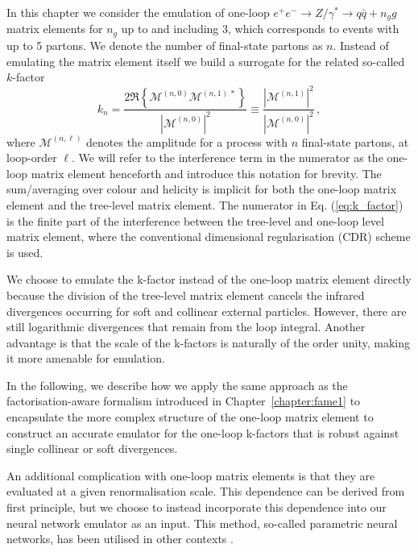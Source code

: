 \documentclass[main.tex]{subfiles}
\begin{document}
In this chapter we consider the emulation of one-loop 
$e^+e^-\rightarrow Z / \gamma^{*} \rightarrow q\bar q +n_{g} g$
matrix elements for $n_{g}$ up to and including 3, which corresponds
to events with up to 5 partons. We denote the number of final-state
partons as $n$. Instead of emulating the matrix element itself we build
a surrogate for the related so-called $k$-factor
\begin{equation}
    k_{n} = \dfrac{2 \Re \left\{ \mathcal{M}^{(n, 0)} \mathcal{M}^{(n, 1)\, *} \right\} }{ |\mathcal{M}^{(n, 0)}|^{2} } \equiv \dfrac{|\mathcal{M}^{(n, 1)}|^{2}}{|\mathcal{M}^{(n, 0)}|^{2}} \, ,
    \label{eq:k_factor}
\end{equation}
where $\mathcal{M}^{(n, \ell)}$ denotes the amplitude
for a process with $n$ final-state partons, at loop-order
$\ell$. We will refer to the interference term in the numerator
as the one-loop matrix element henceforth and introduce
this notation for brevity.
The sum/averaging over colour and helicity is implicit for
both the one-loop matrix element and the tree-level
matrix element. The numerator in Eq. (\ref{eq:k_factor}) is the
finite part of the interference between the tree-level and 
one-loop level matrix element, where the conventional dimensional
regularisation (CDR) scheme is used.

We choose to emulate the k-factor instead of the one-loop matrix
element directly because the division of the tree-level matrix
element cancels the infrared divergences occurring for soft
and collinear external particles. However, there are still
logarithmic divergences that remain from the loop integral. Another 
advantage is that the scale of the k-factors is naturally of
the order unity, making it more amenable for emulation.

In the following, we describe how we apply the same approach as the
factorisation-aware formalism introduced in Chapter~\ref{chapter:fame1}
to encapsulate the more complex structure of the one-loop
matrix element to construct an accurate emulator for the
one-loop k-factors that is robust against single collinear or soft divergences.

An additional complication with one-loop matrix elements
is that they are evaluated at a given renormalisation scale.
This dependence can be derived from first principle, but we choose
to instead incorporate this dependence into our neural network emulator
as an input.
This method, so-called parametric
neural networks, has been utilised in other contexts
\cite{Baldi:2016fzo,Ghosh:2021roe}.
\end{document}
